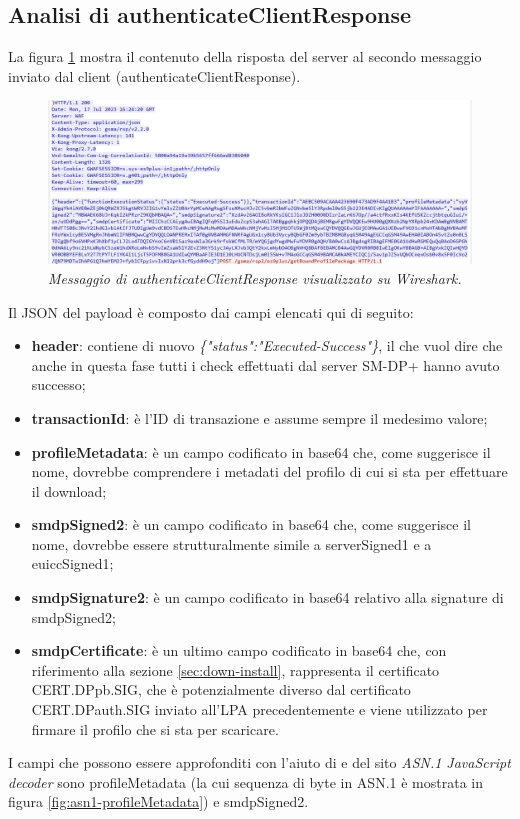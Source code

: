 \documentclass[10pt, oneside]{book}
\begin{document}
\subsection{Analisi di authenticateClientResponse}
La figura \ref{fig:msg4-stream-pcap} mostra il contenuto della risposta del server al secondo messaggio inviato dal client (authenticateClientResponse).\\
\begin{figure}
\includegraphics[width=\linewidth]{msg4-stream-pcap.png}
\caption{\textit{Messaggio di authenticateClientResponse visualizzato su Wireshark.}}
\label{fig:msg4-stream-pcap}
\end{figure}
Il JSON del payload è composto dai campi elencati qui di seguito:
\begin{itemize}
\item \textbf{header}: contiene di nuovo \textit{\{"status":"Executed-Success"\}}, il che vuol dire che anche in questa fase tutti i check effettuati dal server SM-DP+ hanno avuto successo;
\item \textbf{transactionId}: è l'ID di transazione e assume sempre il medesimo valore;
\item \textbf{profileMetadata}: è un campo codificato in base64 che, come suggerisce il nome, dovrebbe comprendere i metadati del profilo di cui si sta per effettuare il download;
\item \textbf{smdpSigned2}: è un campo codificato in base64 che, come suggerisce il nome, dovrebbe essere strutturalmente simile a serverSigned1 e a euiccSigned1;
\item \textbf{smdpSignature2}: è un campo codificato in base64 relativo alla signature di smdpSigned2;
\item \textbf{smdpCertificate}: è un ultimo campo codificato in base64 che, con riferimento alla sezione \ref{sec:down-install}, rappresenta il certificato CERT.DPpb.SIG, che è potenzialmente diverso dal certificato CERT.DPauth.SIG inviato all'LPA precedentemente e viene utilizzato per firmare il profilo che si sta per scaricare.
\end{itemize}
I campi che possono essere approfonditi con l'aiuto di \cite{RSP-definitions} e del sito \textit{ASN.1 JavaScript decoder} sono profileMetadata (la cui sequenza di byte in ASN.1 è mostrata in figura \ref{fig:asn1-profileMetadata}) e smdpSigned2.\\
\end{document}
